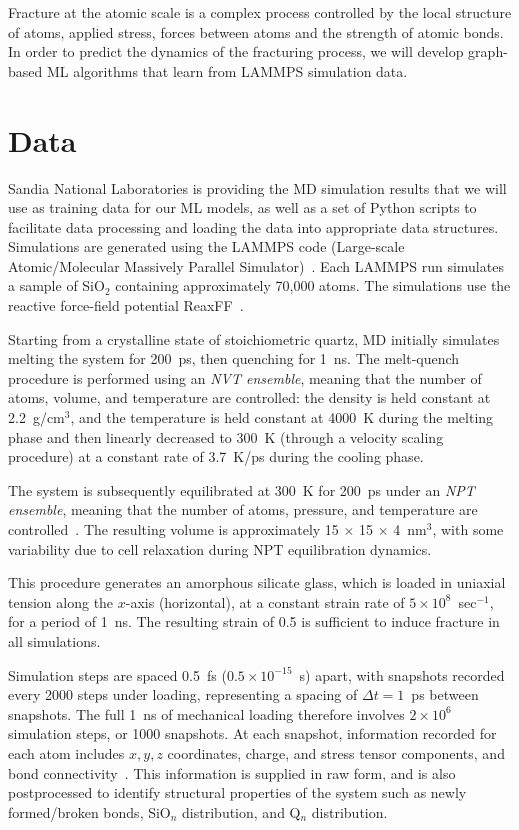 Fracture at the atomic scale is a complex process controlled by the local structure of atoms, applied stress, forces between atoms and the strength of atomic bonds.  In order to predict the dynamics of the fracturing process, we will develop graph-based ML algorithms that learn from LAMMPS simulation data.


\section{Data}
Sandia National Laboratories is providing the MD simulation results that we will use as training data for our ML models, as well as a set of Python scripts to facilitate data processing and loading the data into appropriate data structures. Simulations are generated using the LAMMPS code (Large-scale Atomic/Molecular Massively Parallel Simulator)~\cite{PAMD}.  Each LAMMPS run simulates a sample of SiO$_2$ containing approximately 70,000 atoms. The simulations use the reactive force-field potential ReaxFF~\cite{pitman2012dynamics}.

Starting from a crystalline state of stoichiometric quartz, MD initially simulates melting the system for 200~ps, then quenching for 1~ns. The melt-quench procedure is performed using an \emph{NVT ensemble}, meaning that the number of atoms, volume, and temperature are controlled: the density is held constant at 2.2~g/cm$^3$, and the temperature is held constant at 4000~K during the melting phase and then linearly decreased to 300~K (through a velocity scaling procedure) at a constant rate of 3.7~K/ps during the cooling phase.

The system is subsequently equilibrated at 300~K for 200~ps under an \emph{NPT ensemble}, meaning that the number of atoms, pressure, and temperature are controlled~\cite{markpres}. The resulting volume is approximately 15 $\times$ 15 $\times$ 4~nm$^3$, with some variability due to cell relaxation during NPT equilibration dynamics.

This procedure generates an amorphous silicate glass, which is loaded in uniaxial tension along the $x$-axis (horizontal), at a constant strain rate of $5\times 10^8$~sec$^{-1}$, for a period of 1~ns.  The resulting strain of 0.5 is sufficient to induce fracture in all simulations. %

Simulation steps are spaced 0.5~fs ($0.5 \times 10^{-15}$~s) apart, with snapshots recorded every 2000 steps under loading, representing a spacing of $\Delta t = 1$~ps between snapshots.  The full 1~ns of mechanical loading therefore involves $2 \times 10^6$ simulation steps, or 1000 snapshots. At each snapshot, information recorded for each atom includes $x,y,z$ coordinates, charge, and stress tensor components, and bond connectivity~\cite{markpres}.  This information is supplied in raw form, and is also postprocessed to identify structural properties of the system such as newly formed/broken bonds, SiO$_n$ distribution, and Q$_n$ distribution.


